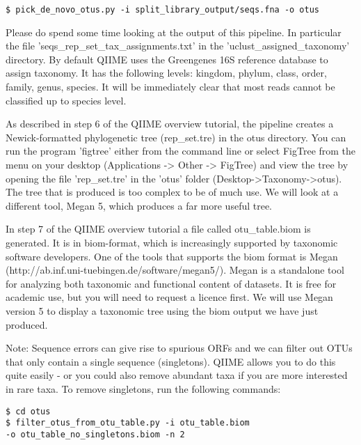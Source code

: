 \documentclass[a4paper,12pt,twoside]{memoir}
\begin{document}
\begin{steps}
\begin{lstlisting}
$ pick_de_novo_otus.py -i split_library_output/seqs.fna -o otus   
\end{lstlisting}
\end{steps}

\begin{note}
Please do spend some time looking at the output of this pipeline. In particular the file 'seqs\_rep\_set\_tax\_assignments.txt' in the 'uclust\_assigned\_taxonomy' directory. By default QIIME uses the Greengenes 16S reference database to assign taxonomy. It has the following levels: kingdom, phylum, class, order, family, genus, species. It will be immediately clear that most reads cannot be classified up to species level.

As described in step 6 of the QIIME overview tutorial, the pipeline creates a Newick-formatted phylogenetic tree (rep\_set.tre) in the otus directory. You can run the program 'figtree' either from the command line or select FigTree from the menu on your desktop (Applications -> Other -> FigTree) and view the tree by opening the file 'rep\_set.tre' in the 'otus' folder (Desktop->Taxonomy->otus). The tree that is produced is too complex to be of much use. We will look at a different tool, Megan 5, which produces a far more useful tree.

In step 7 of the QIIME overview tutorial a file called otu\_table.biom is generated. It is in biom-format, which is increasingly supported by taxonomic software developers. One of the tools that supports the biom format is Megan (http://ab.inf.uni-tuebingen.de/software/megan5/). Megan is a standalone tool for analyzing both taxonomic and functional content of datasets. It is free for academic use, but you will need to request a licence first. We will use Megan version 5 to display a taxonomic tree using the biom output we have just produced.

Note: Sequence errors can give rise to spurious ORFs and we can filter out OTUs that only contain a single sequence (singletons). QIIME allows you to do this quite easily - or you could also remove abundant taxa if you are more interested in rare taxa. To remove singletons, run the following commands:
\end{note}

\begin{steps}
\begin{lstlisting}
$ cd otus
$ filter_otus_from_otu_table.py -i otu_table.biom  
-o otu_table_no_singletons.biom -n 2
\end{lstlisting}
\end{steps}
\end{document}
